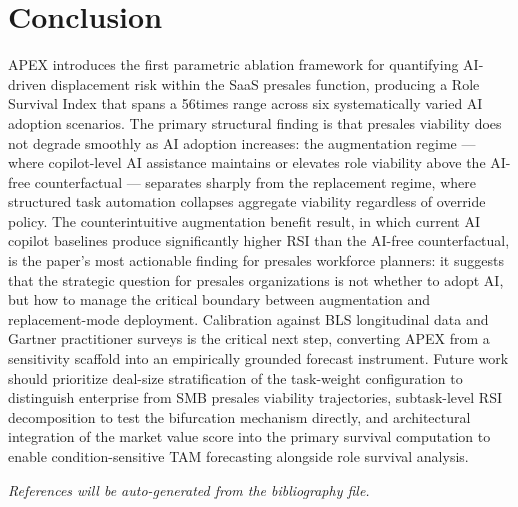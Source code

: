 \documentclass[10pt, conference]{IEEEtran}
\begin{document}
\section{Conclusion}

\label{sec:conclusion}

APEX introduces the first parametric ablation framework for quantifying AI-driven displacement risk within the SaaS presales function, producing a Role Survival Index that spans a 56times range across six systematically varied AI adoption scenarios. The primary structural finding is that presales viability does not degrade smoothly as AI adoption increases: the augmentation regime --- where copilot-level AI assistance maintains or elevates role viability above the AI-free counterfactual --- separates sharply from the replacement regime, where structured task automation collapses aggregate viability regardless of override policy. The counterintuitive augmentation benefit result, in which current AI copilot baselines produce significantly higher RSI than the AI-free counterfactual, is the paper's most actionable finding for presales workforce planners: it suggests that the strategic question for presales organizations is not whether to adopt AI, but how to manage the critical boundary between augmentation and replacement-mode deployment. Calibration against BLS longitudinal data and Gartner practitioner surveys is the critical next step, converting APEX from a sensitivity scaffold into an empirically grounded forecast instrument. Future work should prioritize deal-size stratification of the task-weight configuration to distinguish enterprise from SMB presales viability trajectories, subtask-level RSI decomposition to test the bifurcation mechanism directly, and architectural integration of the market value score into the primary survival computation to enable condition-sensitive TAM forecasting alongside role survival analysis.

\textit{References will be auto-generated from the bibliography file.}



\end{document}
